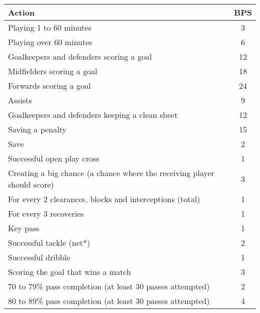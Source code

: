 \begin{table}[H]
\centering
\begin{tabular}{|l|c|}
\hline
\textbf{Action}                                                                   & \textbf{BPS} \\
\hline
Playing 1 to 60 minutes \Tstrut                                                 & 3   \\
Playing over 60 minutes                                                  & 6   \\
Goalkeepers and defenders scoring a goal                                 & 12  \\
Midfielders scoring a goal                                               & 18  \\
Forwards scoring a goal                                                  & 24  \\
Assists                                                                  & 9   \\
Goalkeepers and defenders keeping a clean sheet                          & 12  \\
Saving a penalty                                                         & 15  \\
Save                                                                     & 2   \\
Successful open play cross                                               & 1   \\
Creating a big chance (a chance where the receiving player should score) & 3   \\
For every 2 clearances, blocks and interceptions (total)                 & 1   \\
For every 3 recoveries                                                   & 1   \\
Key pass                                                                 & 1   \\
Successful tackle (net*)                                                 & 2   \\
Successful dribble                                                       & 1   \\
Scoring the goal that wins a match                                       & 3   \\
70 to 79\% pass completion (at least 30 passes attempted)                & 2   \\
80 to 89\% pass completion (at least 30 passes attempted)                & 4   \\

\end{tabular}
\end{table}
